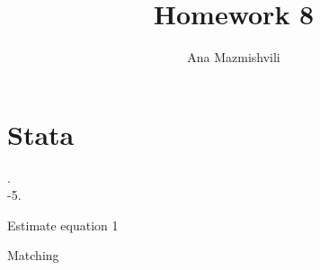 \documentclass{article}
\title{Homework 8}
\author{Ana Mazmishvili}
\begin{document}
  
\maketitle

\section{Stata}
. 
\\

-5. 


\begin{table}[h]
    \centering
    
    \caption{Estimate equation 1}
    \label{tab:reg1}
\end{table}
\clearpage


\begin{table}[h]
    \centering
    
    \caption{Matching}
    \label{tab:match}
\end{table}
\clearpage
\end{document}
